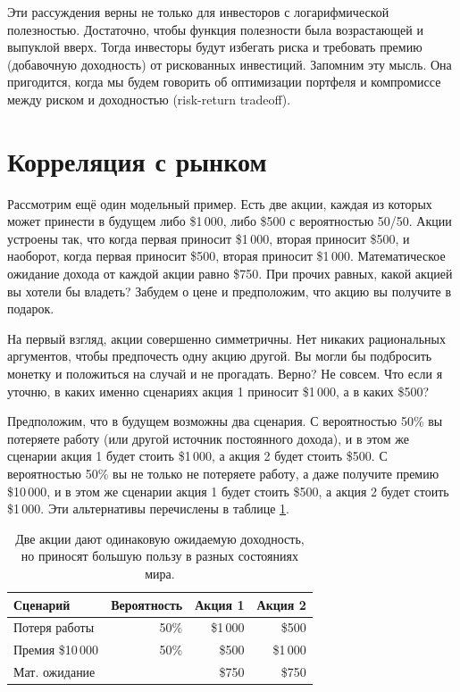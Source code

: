  Эти рассуждения верны не только для инвесторов с логарифмической полезностью. Достаточно, чтобы функция полезности была возрастающей и выпуклой вверх. Тогда инвесторы будут избегать риска и требовать премию (добавочную доходность) от рискованных инвестиций. Запомним эту мысль. Она пригодится, когда мы будем говорить об оптимизации портфеля и компромиссе между риском и доходностью (risk-return tradeoff).

\section{Корреляция с рынком}

Рассмотрим ещё один модельный пример. Есть две акции, каждая из которых может принести в будущем либо \$1\,000, либо \$500 с вероятностью 50/50. Акции устроены так, что когда первая приносит \$1\,000, вторая приносит \$500, и наоборот, когда первая приносит \$500, вторая приносит \$1\,000. Математическое ожидание дохода от каждой акции равно \$750. При прочих равных, какой акцией вы хотели бы владеть? Забудем о цене и предположим, что акцию вы получите в подарок.

На первый взгляд, акции совершенно симметричны. Нет никаких рациональных аргументов, чтобы предпочесть одну акцию другой. Вы могли бы подбросить монетку и положиться на случай и не прогадать. Верно? Не совсем. Что если я уточню, в каких именно сценариях акция 1 приносит \$1\,000, а в каких \$500?

Предположим, что в будущем возможны два сценария. С вероятностью 50\% вы потеряете работу (или другой источник постоянного дохода), и в этом же сценарии акция 1 будет стоить \$1\,000, а акция 2 будет стоить \$500. С вероятностью 50\% вы не только не потеряете работу, а даже получите премию \$10\,000, и в этом же сценарии акция 1 будет стоить \$500, а акция 2 будет стоить \$1\,000. Эти альтернативы перечислены в таблице \ref{two_shares_states_of_nature}.

\begin{table}[h!]
\centering
\begin{tabular}{l|r|r|r}
Сценарий                 & Вероятность & Акция 1 & Акция 2 \\  \hline
Потеря работы      & 50\%                 & \$1\,000 & \$500 \\
Премия \$10\,000 & 50\%                 & \$500      & \$1\,000 \\ \hline
\multicolumn{2}{l|}{Мат. ожидание} & \$750 & \$750 
\end{tabular}
\caption{Две акции дают одинаковую ожидаемую доходность, но приносят большую пользу в разных состояниях мира.}
\label{two_shares_states_of_nature}
\end{table}

